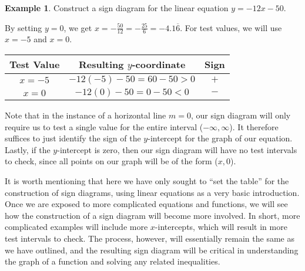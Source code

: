 \documentclass[12pt]{book}
\theoremstyle{definition}
\newtheorem{example}{Example}
\begin{document}
\begin{example}\label{Lin99} Construct a sign diagram for the linear equation $y=-12x-50$.\par
By setting $y=0$, we get $x=-\frac{50}{12}=-\frac{25}{6}=-4.1\overline{6}$.  For test values, we will use $x=-5$ and $x=0$.
\begin{center}
\begin{tabular}{|c|c|c|}
\hline
Test Value & Resulting $y$-coordinate & Sign\\
\hline
$x=-5$ & $-12(-5)-50=60-50>0$ & $+$\\
\hline
$x=0$ & $-12(0)-50=0-50<0$ & $-$\\
\hline
\end{tabular}
\end{center}
\begin{center}
\end{center}
\end{example}
Note that in the instance of a horizontal line $m=0$, our sign diagram will only require us to test a single value for the entire interval ($-\infty,\infty$).  It therefore suffices to just identify the sign of the $y$-intercept for the graph of our equation.  Lastly, if the $y$-intercept is zero, then our sign diagram will have no test intervals to check, since all points on our graph will be of the form ($x,0$).\par
It is worth mentioning that here we have only sought to ``set the table'' for the construction of sign diagrams, using linear equations as a very basic introduction.  Once we are exposed to more complicated equations and functions, we will see how the construction of a sign diagram will become more involved.  In short, more complicated examples will include more $x$-intercepts, which will result in more test intervals to check.  The process, however, will essentially remain the same as we have outlined, and the resulting sign diagram will be critical in understanding the graph of a function and solving any related inequalities.
\end{document}
